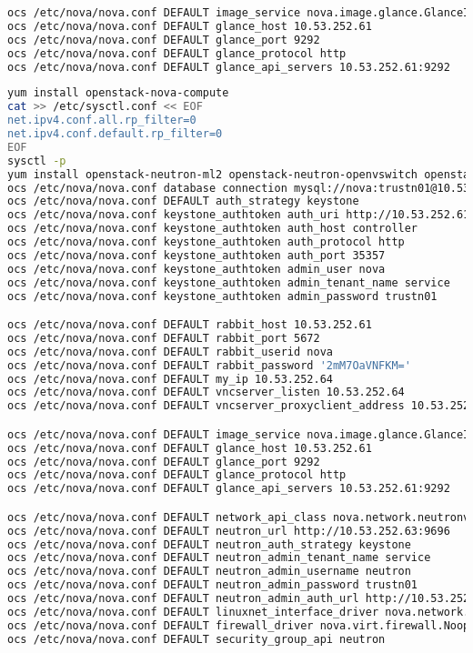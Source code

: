 \documentclass[11pt,letterpaper,oneside]{book}
\begin{document}
\begin{lstlisting}[caption={Nova Glance configuration},language=bash]
ocs /etc/nova/nova.conf DEFAULT image_service nova.image.glance.GlanceImageService
ocs /etc/nova/nova.conf DEFAULT glance_host 10.53.252.61
ocs /etc/nova/nova.conf DEFAULT glance_port 9292
ocs /etc/nova/nova.conf DEFAULT glance_protocol http
ocs /etc/nova/nova.conf DEFAULT glance_api_servers 10.53.252.61:9292
\end{lstlisting}


\begin{lstlisting}[caption={vircmppaw001},language=bash]
yum install openstack-nova-compute
cat >> /etc/sysctl.conf << EOF
net.ipv4.conf.all.rp_filter=0
net.ipv4.conf.default.rp_filter=0
EOF
sysctl -p
yum install openstack-neutron-ml2 openstack-neutron-openvswitch openstack-nova-compute -y
ocs /etc/nova/nova.conf database connection mysql://nova:trustn01@10.53.252.61/nova
ocs /etc/nova/nova.conf DEFAULT auth_strategy keystone
ocs /etc/nova/nova.conf keystone_authtoken auth_uri http://10.53.252.61:5000
ocs /etc/nova/nova.conf keystone_authtoken auth_host controller
ocs /etc/nova/nova.conf keystone_authtoken auth_protocol http
ocs /etc/nova/nova.conf keystone_authtoken auth_port 35357
ocs /etc/nova/nova.conf keystone_authtoken admin_user nova
ocs /etc/nova/nova.conf keystone_authtoken admin_tenant_name service
ocs /etc/nova/nova.conf keystone_authtoken admin_password trustn01

ocs /etc/nova/nova.conf DEFAULT rabbit_host 10.53.252.61
ocs /etc/nova/nova.conf DEFAULT rabbit_port 5672
ocs /etc/nova/nova.conf DEFAULT rabbit_userid nova
ocs /etc/nova/nova.conf DEFAULT rabbit_password '2mM7OaVNFKM='
ocs /etc/nova/nova.conf DEFAULT my_ip 10.53.252.64
ocs /etc/nova/nova.conf DEFAULT vncserver_listen 10.53.252.64
ocs /etc/nova/nova.conf DEFAULT vncserver_proxyclient_address 10.53.252.62

ocs /etc/nova/nova.conf DEFAULT image_service nova.image.glance.GlanceImageService
ocs /etc/nova/nova.conf DEFAULT glance_host 10.53.252.61
ocs /etc/nova/nova.conf DEFAULT glance_port 9292
ocs /etc/nova/nova.conf DEFAULT glance_protocol http
ocs /etc/nova/nova.conf DEFAULT glance_api_servers 10.53.252.61:9292

ocs /etc/nova/nova.conf DEFAULT network_api_class nova.network.neutronv2.api.API
ocs /etc/nova/nova.conf DEFAULT neutron_url http://10.53.252.63:9696
ocs /etc/nova/nova.conf DEFAULT neutron_auth_strategy keystone
ocs /etc/nova/nova.conf DEFAULT neutron_admin_tenant_name service
ocs /etc/nova/nova.conf DEFAULT neutron_admin_username neutron
ocs /etc/nova/nova.conf DEFAULT neutron_admin_password trustn01
ocs /etc/nova/nova.conf DEFAULT neutron_admin_auth_url http://10.53.252.61:35357/v2.0
ocs /etc/nova/nova.conf DEFAULT linuxnet_interface_driver nova.network.linux_net.LinuxOVSInterfaceDriver
ocs /etc/nova/nova.conf DEFAULT firewall_driver nova.virt.firewall.NoopFirewallDriver
ocs /etc/nova/nova.conf DEFAULT security_group_api neutron



\end{lstlisting}
\end{document}
